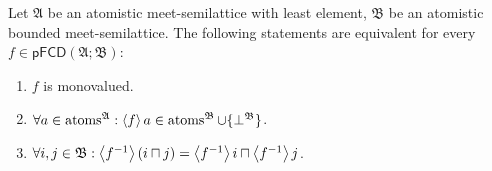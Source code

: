 \begin{thm}
Let $\mathfrak{A}$ be an atomistic meet-semilattice with least element,
$\mathfrak{B}$ be an atomistic bounded meet-semilattice. The following
statements are equivalent for every $f\in\mathsf{pFCD}(\mathfrak{A};\mathfrak{B})$:
\begin{enumerate}
\item \label{pf-thm:func-mono-def}$f$ is monovalued.
\item \label{pf-thm:func-mono-atom}$\forall a\in\operatorname{atoms}^{\mathfrak{A}}:\left\langle f\right\rangle a\in\operatorname{atoms}^{\mathfrak{B}}\cup\{\bot^{\mathfrak{B}}\}$.
\item \label{pf-thm:func-mono-intr-flt}$\forall i,j\in\mathfrak{B}:\left\langle f^{-1}\right\rangle(i\sqcap j)=\left\langle f^{-1}\right\rangle i\sqcap\left\langle f^{-1}\right\rangle j$.
\end{enumerate}
\end{thm}
